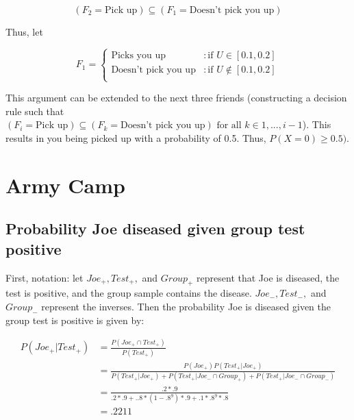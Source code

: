 \documentclass[paper=a4, fontsize=11pt]{scrartcl} %
\numberwithin{equation}{section} %
\numberwithin{figure}{section} %
\numberwithin{table}{section} %
\begin{document}
 \begin{equation*}
 (F_2 = \text{Pick up}) \subseteq (F_1 = \text{Doesn't pick you up})
 \end{equation*}

Thus, let  

 \begin{displaymath}
   F_1 = \left\{
     \begin{array}{lr}
       \text{Picks you up} & : \text{if } U \in [0.1,0.2]\\
       \text{Doesn't pick you up} & : \text{if } U \notin [0.1,0.2]\\
     \end{array}
   \right.
\end{displaymath} 

This argument can be extended to the next three friends (constructing a decision rule such that $ (F_i = \text{Pick up}) \subseteq (F_{k} = \text{Doesn't pick you up})  \text{ for all } k \in {1, ..., i-1}$). This results in you being picked up with a probability of 0.5. Thus, $P(X=0) \geq 0.5)$.

\section{Army Camp}

\subsection{Probability Joe diseased given group test positive}

First, notation: let $Joe_+, Test_+,$ and $Group_+$ represent that Joe is diseased, the test is positive, and the group sample contains the disease. $Joe_-, Test_-,$ and $Group_-$ represent the inverses. Then the probability Joe is diseased given the group test is positive is given by:

\begin{align*}
P(Joe_+ | Test_+)& = \frac{P(Joe_+ \cap Test_+)}{P(Test_+)}\\
   & = \frac{P(Joe_+)P(Test_+ | Joe_+)}{P(Test_+ | Joe_+)+P(Test_+ | Joe_- \cap Group_+)+P(Test_+ | Joe_- \cap Group_-)}\\
   & = \frac{.2*.9}{.2*.9+..8*(1-.8^9)*.9+.1*.8^9*.8}\\
   & = .2211
\end{align*}
\end{document}

